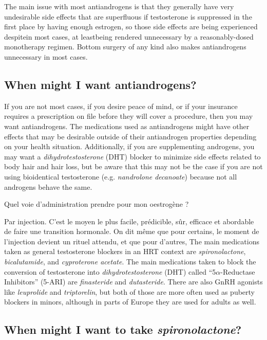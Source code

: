\documentclass{article}
\begin{document}
The main issue with most antiandrogens is that they generally have very undesirable side effects that are superfluous if testosterone is suppressed in the first place by having enough estrogen, so those side effects are being experienced despite\textemdash{}in most cases, at least\textemdash{}being rendered unnecessary by a reasonably-dosed monotherapy regimen. Bottom surgery of any kind also makes antiandrogens unnecessary in most cases.

\subsection{When might I want antiandrogens?}

If you are not most cases, if you desire peace of mind, or if your insurance requires a prescription on file before they will cover a procedure, then you may want antiandrogens. The medications used as antiandrogens might have other effects that may be desirable outside of their antiandrogen properties depending on your health situation. Additionally, if you are supplementing androgens, you may want a \textit{dihydrotestosterone }(DHT) blocker to minimize side effects related to body hair and hair loss, but be aware that this may not be the case if you are not using bioidentical testosterone (e.g. \textit{nandrolone decanoate}) because not all androgens behave the same.


Quel voie d'administration prendre pour mon oestrogène ?

Par injection. C'est le moyen le plus facile, prédicible, sûr, efficace et abordable de faire une transition hormonale. On dit même que pour certains, le moment de l'injection devient un rituel attendu, et que pour d'autres,  
The main medications taken as general testosterone blockers in an HRT context are \textit{spironolactone}, \textit{bicalutamide}, and \textit{cyproterone acetate}. The main medications taken to block the conversion of testosterone into \textit{dihydrotestosterone} (DHT) called “5$\alpha$-Reductase Inhibitors” (5-ARI) are \textit{finasteride} and \textit{dutasteride}. There are also GnRH agonists like \textit{leuprolide} and \textit{triptorelin}, but both of those are more often used as puberty blockers in minors, although in parts of Europe they are used for adults as well.

\subsection{When might I want to take \textit{spironolactone}?}
\end{document}
